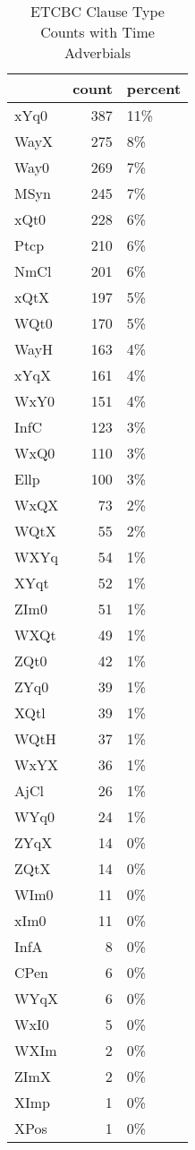 \begin{table}[htbp!]
\centering
\caption{ETCBC Clause Type Counts with Time Adverbials}
\label{table:cltype_cts}
\begin{adjustbox}{width=1\textwidth}
\begin{tabular}{lrl}
\toprule
{} &  count & percent \\
\midrule
xYq0 &    387 &     11\% \\
WayX &    275 &      8\% \\
Way0 &    269 &      7\% \\
MSyn &    245 &      7\% \\
xQt0 &    228 &      6\% \\
Ptcp &    210 &      6\% \\
NmCl &    201 &      6\% \\
xQtX &    197 &      5\% \\
WQt0 &    170 &      5\% \\
WayH &    163 &      4\% \\
xYqX &    161 &      4\% \\
WxY0 &    151 &      4\% \\
InfC &    123 &      3\% \\
WxQ0 &    110 &      3\% \\
Ellp &    100 &      3\% \\
WxQX &     73 &      2\% \\
WQtX &     55 &      2\% \\
WXYq &     54 &      1\% \\
XYqt &     52 &      1\% \\
ZIm0 &     51 &      1\% \\
WXQt &     49 &      1\% \\
ZQt0 &     42 &      1\% \\
ZYq0 &     39 &      1\% \\
XQtl &     39 &      1\% \\
WQtH &     37 &      1\% \\
WxYX &     36 &      1\% \\
AjCl &     26 &      1\% \\
WYq0 &     24 &      1\% \\
ZYqX &     14 &      0\% \\
ZQtX &     14 &      0\% \\
WIm0 &     11 &      0\% \\
xIm0 &     11 &      0\% \\
InfA &      8 &      0\% \\
CPen &      6 &      0\% \\
WYqX &      6 &      0\% \\
WxI0 &      5 &      0\% \\
WXIm &      2 &      0\% \\
ZImX &      2 &      0\% \\
XImp &      1 &      0\% \\
XPos &      1 &      0\% \\
\bottomrule
\end{tabular}
\end{adjustbox}
\end{table}
